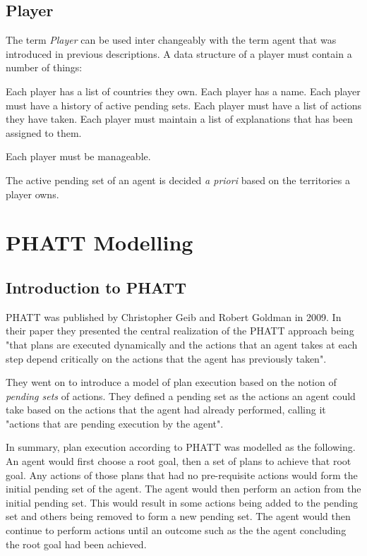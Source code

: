 \documentclass[parskip]{cs4rep}
\begin{document}
\subsection{Player}

The term \textit{Player} can be used inter changeably with the term agent that was introduced in previous descriptions. A data structure of a player must contain a number of things:

Each player has a list of countries they own.
Each player has a name.
Each player must have a history of active pending sets.
Each player must have a list of actions they have taken.
Each player must maintain a list of explanations that has been assigned to them.

Each player must be manageable.

The active pending set of an agent is decided \textit{a priori} based on the territories a player owns.

\section{PHATT Modelling}

\subsection{Introduction to PHATT}

PHATT was published by Christopher Geib and Robert Goldman in 2009. In their paper they presented the central realization of the PHATT approach being "that plans are executed dynamically and the actions that an agent takes at each step depend critically on the actions that the agent has previously taken". 

They went on to introduce a model of plan execution based on the notion of \textit{pending sets} of actions. They defined a pending set as the actions an agent could take based on the actions that the agent had already performed, calling it "actions that are pending execution by the agent".

In summary, plan execution according to PHATT was modelled as the following. An agent would first choose a root goal, then a set of plans to achieve that root goal. Any actions of those plans that had no pre-requisite actions would form the initial pending set of the agent. The agent would then perform an action from the initial pending set. This would result in some actions being added to the pending set and others being removed to form a new pending set. The agent would then continue to perform actions until an outcome such as the the agent concluding the root goal had been achieved.
\end{document}
